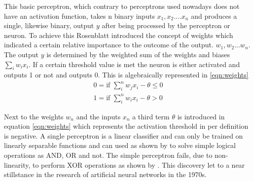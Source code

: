 This basic perceptron, which contrary to perceptrons used nowadays does not have an activation function, takes n binary
inputs $x_1 , x_2 .... x_n$ and produces a single, likewise binary, output $y$ after being processed by the perceptron or neuron.
To achieve this Rosenblatt introduced the concept of weights which indicated a certain relative importance to the outcome of the
output. $w_1 , w_2 ... w_n$. The output $y$ is determined by the weighted sum of the weights and biases $\sum_i w_ix_i $. If a certain
threshold value is met  the neuron is either activated and outputs 1 or not and outputs 0. This is algebraically represented in
\ref{eqn:weights}
\begin{subequations}
  \begin{align}
    0  = \mbox{if } \sum_i^n w_j x_i - \theta \leq 0 \\
    1 =  \mbox{if } \sum_i^n w_i x_i - \theta > 0
  \end{align}
  \label{eqn:weights}
\end{subequations}

Next to the weights $w_n$ and the inputs $x_n$ a third term $\theta$ is introduced in equation \ref{eqn:weights} which represents
the activation threshold in per definition is negative. A single perceptron is a linear classifier and can only be trained on
linearly separable functions and can used as shown by \cite{rosenblatt1961} to solve simple logical operations as AND, OR and not.
The simple perceptron fails, due to non-linearity, to perform XOR operations as shown by \cite{marvin1969}. This discovery let to
a near stillstance in the research of artificial neural networks in the 1970s.



